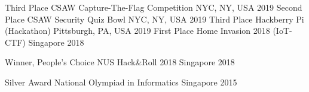 


\begin{cvhonors}

  \cvhonor
    {Third Place} %
    {CSAW Capture-The-Flag Competition} %
    {NYC, NY, USA} %
    {2019} %
  \cvhonor
    {Second Place} %
    {CSAW Security Quiz Bowl} %
    {NYC, NY, USA} %
    {2019} %
  \cvhonor
    {Third Place} %
    {Hackberry Pi (Hackathon)} %
    {Pittsburgh, PA, USA} %
    {2019} %
  \cvhonor
    {First Place} %
    {Home Invasion 2018 (IoT-CTF)} %
    {Singapore} %
    {2018} %


  \cvhonor
    {Winner, People's Choice} %
    {NUS Hack\&Roll 2018} %
    {Singapore} %
    {2018} %

  \cvhonor
    {Silver Award} %
    {National Olympiad in Informatics} %
    {Singapore} %
    {2015} %

\end{cvhonors}
